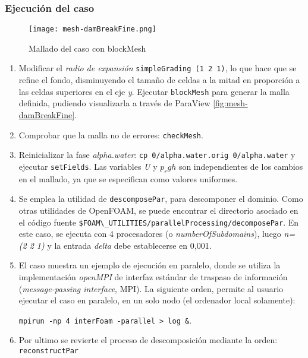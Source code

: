 \subsubsection{Ejecución del caso}\label{header-n720}

\begin{figure}[ht]
\centering
\texttt{[image: mesh-damBreakFine.png]}
\caption{Mallado del caso con blockMesh}
\label{fig:mesh-damBreakFine}
\end{figure}

\begin{enumerate}
\def\labelenumi{\arabic{enumi}.}
\item
  Modificar el \emph{radio de expansión}
  \lstinline[style=c++]{simpleGrading (1 2 1)}, lo que hace que se refine el fondo,
  disminuyendo el tamaño de celdas a la mitad en proporción a las celdas
  superiores en el eje \emph{y}. Ejecutar \texttt{blockMesh} para generar la
  malla definida, pudiendo visualizarla a través de ParaView \autoref{fig:mesh-damBreakFine}.

\item
  Comprobar que la malla no de errores: \texttt{checkMesh}.
\item
  Reinicializar la fase \emph{alpha.water}:
  \lstinline[style=bash]{cp 0/alpha.water.orig 0/alpha.water} y ejecutar
  \texttt{setFields}. Las variables \emph{U} y \emph{$p_rgh$} son
  independientes de los cambios en el mallado, ya que se especifican
  como valores uniformes.
\item
  Se emplea la utilidad de \texttt{descomposePar}, para descomponer el
  dominio. Como otras utilidades de OpenFOAM, se puede encontrar el
  directorio asociado en el código fuente
  \lstinline[style=bash]{$FOAM\_UTILITIES/parallelProcessing/decomposePar}.
  En este caso, se ejecuta con 4 procesadores (o
  \emph{numberOfSubdomains}), luego \emph{n= (2 2 1)} y la entrada
  \emph{delta} debe establecerse en 0,001.
\item
  El caso muestra un ejemplo de ejecución en paralelo, donde se utiliza
  la implementación \emph{openMPI} de interfaz estándar de traspaso de
  información (\emph{message-passing interface}, MPI). La siguiente
  orden, permite al usuario ejecutar el caso en paralelo, en un solo
  nodo (el ordenador local solamente):

  \lstinline[style=bash]{mpirun -np 4 interFoam -parallel > log &}.
\item
  Por ultimo se revierte el proceso de descomposición mediante la orden:
  \texttt{reconstructPar}
\end{enumerate}

